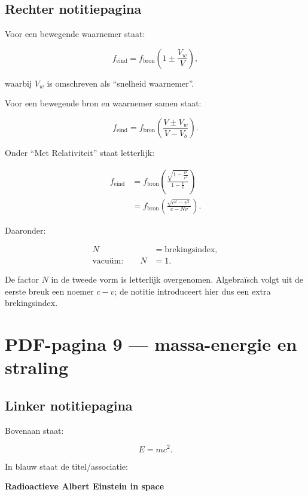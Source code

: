 \documentclass[11pt,a4paper]{article}
\begin{document}
\subsection*{Rechter notitiepagina}

Voor een bewegende waarnemer staat:

$$
f_{\mathrm{eind}}
=
f_{\mathrm{bron}}
\left(
1\pm\frac{V_w}{V}
\right),
$$

waarbij $V_w$ is omschreven als ``snelheid waarnemer''.

Voor een bewegende bron en waarnemer samen staat:

$$
f_{\mathrm{eind}}
=
f_{\mathrm{bron}}
\left(
\frac{V\pm V_w}{V-V_b}
\right).
$$

Onder ``Met Relativiteit'' staat letterlijk:

\begin{align*}
f_{\mathrm{eind}}
&=
f_{\mathrm{bron}}
\left(
\frac{\sqrt{1-\frac{v^2}{c^2}}}{1-\frac{v}{c}}
\right)\\
&=
f_{\mathrm{bron}}
\left(
\frac{\sqrt{c^2-v^2}}{c-Nv}
\right).
\end{align*}

Daaronder:

\begin{align*}
N&={}\text{brekingsindex},\\
\text{vacuüm:}\qquad N&=1.
\end{align*}

\noindent
De factor $N$ in de tweede vorm is letterlijk overgenomen. Algebraïsch volgt
uit de eerste breuk een noemer $c-v$; de notitie introduceert hier dus een
extra brekingsindex.

\newpage
\section*{PDF-pagina 9 --- massa-energie en straling}

\subsection*{Linker notitiepagina}

Bovenaan staat:

$$
E=mc^2.
$$

In blauw staat de titel/associatie:

\begin{center}
\textcolor{inkblue}{\Large \textbf{Radioactieve Albert Einstein in space}}
\end{center}
\end{document}
